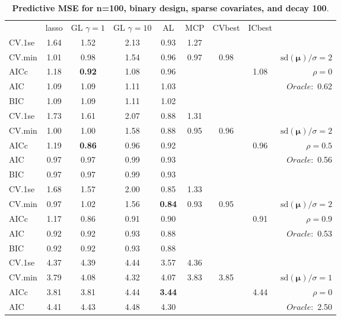 \clearpage
\begin{table}\vspace{-.5cm}
\caption[l]{ { \bf Predictive MSE for n=100, binary design, 
sparse covariates, and  decay  100}.}
\vspace{-.5cm}
\footnotesize{}
\begin{center}
\begin{tabular}{l*{7}{c}|r}
 & lasso & GL $\gamma=1$ & GL $\gamma=10$ & AL & MCP  & CVbest & ICbest  \\
\cline{1-9}
CV.1se & 1.64 & 1.52 & 2.13 & 0.93 & 1.27 & & & \\
CV.min & 1.01 & 0.98 & 1.54 & 0.96 & 0.97 & 0.98 & & $\mathrm{sd}(\mathbf{\mu})/\sigma=2$ \\
AICc & 1.18 & {\bf 0.92} & 1.08 & 0.96 & & & 1.08 &  $\rho=0$ \\
AIC & 1.09 & 1.09 & 1.11 & 1.03 & & & &  \multirow{2}{*}{$Oracle: $ 0.62} \\
BIC & 1.09 & 1.09 & 1.11 & 1.02 & & & &  \\
 \hline 
CV.1se & 1.73 & 1.61 & 2.07 & 0.88 & 1.31 & & & \\
CV.min & 1.00 & 1.00 & 1.58 & 0.88 & 0.95 & 0.96 & & $\mathrm{sd}(\mathbf{\mu})/\sigma=2$ \\
AICc & 1.19 & {\bf 0.86} & 0.96 & 0.92 & & & 0.96 &  $\rho=0.5$ \\
AIC & 0.97 & 0.97 & 0.99 & 0.93 & & & &  \multirow{2}{*}{$Oracle: $ 0.56} \\
BIC & 0.97 & 0.97 & 0.99 & 0.93 & & & &  \\
 \hline 
CV.1se & 1.68 & 1.57 & 2.00 & 0.85 & 1.33 & & & \\
CV.min & 0.97 & 1.02 & 1.56 & {\bf 0.84} & 0.93 & 0.95 & & $\mathrm{sd}(\mathbf{\mu})/\sigma=2$ \\
AICc & 1.17 & 0.86 & 0.91 & 0.90 & & & 0.91 &  $\rho=0.9$ \\
AIC & 0.92 & 0.92 & 0.93 & 0.88 & & & &  \multirow{2}{*}{$Oracle: $ 0.53} \\
BIC & 0.92 & 0.92 & 0.93 & 0.88 & & & &  \\
 \hline 
CV.1se & 4.37 & 4.39 & 4.44 & 3.57 & 4.36 & & & \\
CV.min & 3.79 & 4.08 & 4.32 & 4.07 & 3.83 & 3.85 & & $\mathrm{sd}(\mathbf{\mu})/\sigma=1$ \\
AICc & 3.81 & 3.81 & 4.44 & {\bf 3.44} & & & 4.44 &  $\rho=0$ \\
AIC & 4.41 & 4.43 & 4.48 & 4.30 & & & &  \multirow{2}{*}{$Oracle: $ 2.50} \\

\end{tabular}
\end{center}
\end{table}

